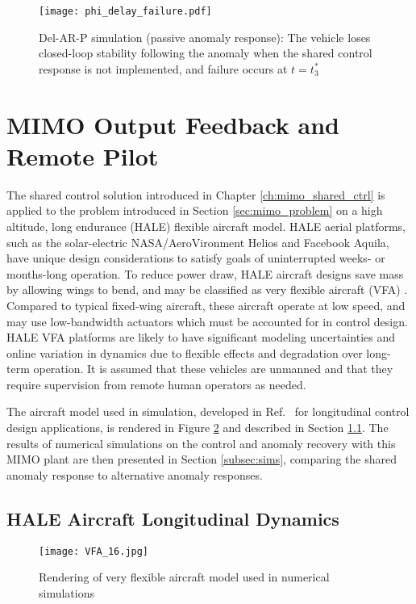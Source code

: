 \begin{figure}[h!]
	\centering
	\texttt{[image: phi\_delay\_failure.pdf]}
	\caption{Del-AR-P simulation (passive anomaly response): The vehicle loses closed-loop stability following the anomaly when the shared control response is not implemented, and failure occurs at $t = t_3^*$}
	\label{fig:command_and_output_d_fail}
\end{figure}

\clearpage

\section{MIMO Output Feedback and Remote Pilot}
The shared control solution introduced in Chapter \ref{ch:mimo_shared_ctrl} is applied to the problem introduced in Section \ref{sec:mimo_problem} on a high altitude, long endurance (HALE) flexible aircraft model. HALE aerial platforms, such as the solar-electric NASA/AeroVironment Helios and Facebook Aquila, have unique design considerations to satisfy goals of uninterrupted weeks- or months-long operation. To reduce power draw, HALE aircraft designs save mass by allowing wings to bend, and may be classified as very flexible aircraft (VFA) \cite{gibson2011modeling}. Compared to typical fixed-wing aircraft, these aircraft operate at low speed, and may use low-bandwidth actuators which must be accounted for in control design. HALE VFA platforms are likely to have significant modeling uncertainties and online variation in dynamics due to flexible effects and degradation over long-term operation. It is assumed that these vehicles are unmanned and that they require supervision from remote human operators as needed.

The aircraft model used in simulation, developed in Ref.~\cite{gibson2011modeling} for longitudinal control design applications, is rendered in Figure \ref{fig:vfa} and described in Section \ref{subsec:vfa_model}. The results of numerical simulations on the control and anomaly recovery with this MIMO plant are then presented in Section \ref{subsec:sims}, comparing the shared anomaly response to alternative anomaly responses.

\subsection{HALE Aircraft Longitudinal Dynamics}\label{subsec:vfa_model}

\begin{figure}[htbp]
	\centering
	\texttt{[image: VFA\_16.jpg]}
	\caption{Rendering of very flexible aircraft model used in numerical simulations}
	\label{fig:vfa}
\end{figure}

